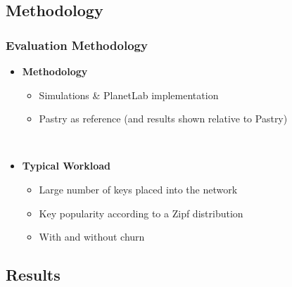 \documentclass[xcolor=pdftex,dvipsnames,table]{beamer}
\begin{document}
\subsection{Methodology}
\begin{frame}
    \frametitle{Evaluation Methodology}
    \begin{itemize}
    \item{\textbf{Methodology}}
        \begin{itemize}
        \item{Simulations \& PlanetLab implementation}
        \item{Pastry as reference (and results shown relative to Pastry)}
        \end{itemize}
        ~\\
    \item{\textbf{Typical Workload}}
        \begin{itemize}
        \item{Large number of keys placed into the network}
        \item{Key popularity according to a Zipf distribution}
        \item{With and without churn}
        \end{itemize}
    \end{itemize}
\end{frame}


\subsection{Results}
\end{document}
